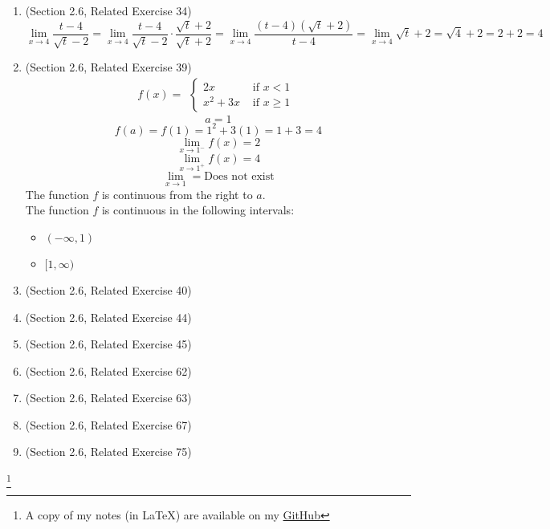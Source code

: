 \documentclass{article}
\newcommand\blfootnote[1]{
    \begingroup
    \renewcommand\thefootnote{}\footnote{#1}
    \addtocounter{footnote}{-1}
    \endgroup
}
\begin{document}
\begin{enumerate}
	\item (Section 2.6, Related Exercise 34)
		$$\lim_{x \to 4}{\frac{t - 4}{\sqrt{t} - 2}} = \lim_{x \to 4}{\frac{t - 4}{\sqrt{t} - 2} \cdot \frac{\sqrt{t} + 2}{\sqrt{t} + 2}} = \lim_{x \to 4}{\frac{(t - 4)(\sqrt{t} + 2)}{t - 4}} = \lim_{x \to 4}{\sqrt{t} + 2} = \sqrt{4} + 2 = 2 + 2 = 4$$
	\item (Section 2.6, Related Exercise 39)
		$$f(x) = \begin{aligned}
			\begin{cases}
				2x &\text{ if } x < 1 \\
				x^2 + 3x &\text{ if } x \geq 1
			\end{cases}
		\end{aligned}$$
		$$a = 1$$
		$$f(a) = f(1) = 1^2 + 3(1) = 1+3 = 4$$
		$$\lim_{x \to 1^-}{f(x)} = 2$$
		$$\lim_{x \to 1^+}{f(x)} = 4$$
		$$\lim_{x \to 1} = \text{Does not exist}$$
		The function $f$ is continuous from the right to $a$. \\
		The function $f$ is continuous in the following intervals:
		\begin{itemize}
			\item $(- \infty, 1)$
			\item $[1, \infty)$
		\end{itemize}
	\item (Section 2.6, Related Exercise 40)
	\item (Section 2.6, Related Exercise 44)
	\item (Section 2.6, Related Exercise 45)
	\item (Section 2.6, Related Exercise 62)
	\item (Section 2.6, Related Exercise 63)
	\item (Section 2.6, Related Exercise 67)
	\item (Section 2.6, Related Exercise 75)
\end{enumerate}
\blfootnote{A copy of my notes (in \LaTeX) are available on my \href{https://github.com/onlinechronically/MATH-211}{GitHub}}
\end{document}
